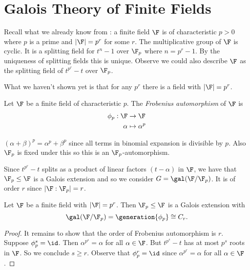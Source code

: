 \documentclass[a4paper]{article}
\begin{document}
\section{Galois Theory of Finite Fields}

Recall what we already know from : a finite field \(\F\) is of characteristic \(p > 0\) where \(p\) is a prime and \(|\F| = p^r\) for some \(r\). The multiplicative group of \(\F\) is cyclic. It is a splitting field for \(t^n - 1\) over \(\F_p\) where \(n = p^r - 1\). By the uniqueness of splitting fields this is unique. Observe we could also describe \(\F\) as the splitting field of \(t^{p^r} - t\) over \(\F_p\).

What we haven't shown yet is that for any \(p^r\) there is a field with \(|\F| = p^r\).

\begin{definition}
  Let \(\F\) be a finite field of characteristic \(p\). The \emph{Frobenius automorphism} of \(\F\) is
  \begin{align*}
    \phi_p: \F &\to \F \\
    \alpha &\mapsto \alpha^p
  \end{align*}
\end{definition}

\begin{remark}
  \((\alpha + \beta)^p = \alpha^p + \beta^p\) since all terms in binomial expansion is divisible by \(p\). Also \(\F_p\) is fixed under this so this is an \(\F_p\)-automorphism.
\end{remark}

Since \(t^{p^r} - t\) splits as a product of linear factors \((t - \alpha)\) in \(\F\), we have that \(\F_p \leq \F\) is a Galois extension and so we consider \(G = \gal(\F/\F_p)\). It is of order \(r\) since \(|\F:\F_p| = r\).

\begin{theorem}
  Let \(\F\) be a finite field with \(|\F| = p^r\). Then \(\F_p \leq \F\) is a Galois extension with
  \[
    \gal(\F/\F_p) = \generation{\phi_p} \cong C_r.
  \]
\end{theorem}

\begin{proof}
  It remains to show that the order of Frobenius automorphism is \(r\). Suppose \(\phi_p^s = \id\). Then \(\alpha^{p^s} = \alpha\) for all \(\alpha \in \F\). But \(t^{p^s} - t\) has at most \(p^s\) roots in \(\F\). So we conclude \(s \geq r\). Observe that \(\phi_p^r = \id\) since \(\alpha^{p^r} = \alpha\) for all \(\alpha \in \F\).
\end{proof}
\end{document}
